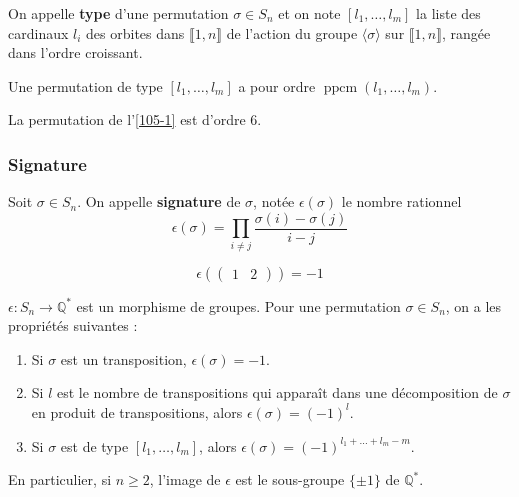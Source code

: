   \begin{definition}
    On appelle \textbf{type} d'une permutation $\sigma \in S_n$ et on note $[l_1, \dots, l_m]$ la liste des cardinaux $l_i$ des orbites dans $\llbracket 1, n \rrbracket$ de l'action du groupe $\langle \sigma \rangle$ sur $\llbracket 1, n \rrbracket$, rangée dans l'ordre croissant.
  \end{definition}

  \begin{proposition}
    Une permutation de type $[l_1, \dots, l_m]$ a pour ordre $\operatorname{ppcm}(l_1, \dots, l_m)$.
  \end{proposition}

  \begin{example}
    La permutation de l'\cref{105-1} est d'ordre $6$.
  \end{example}

  \subsubsection{Signature}

  \begin{definition}
    Soit $\sigma \in S_n$. On appelle \textbf{signature} de $\sigma$, notée $\epsilon(\sigma)$ le nombre rationnel
    \[ \epsilon(\sigma) = \prod_{i \neq j} \frac{\sigma(i) - \sigma(j)}{i-j} \]
  \end{definition}

  \begin{example}
    \[ \epsilon(\begin{pmatrix} 1 & 2 \end{pmatrix}) = -1 \]
  \end{example}

  \begin{proposition}
    $\epsilon : S_n \rightarrow \mathbb{Q}^*$ est un morphisme de groupes. Pour une permutation $\sigma \in S_n$, on a les propriétés suivantes :
    \begin{enumerate}[label=(\roman*)]
      \item Si $\sigma$ est un transposition, $\epsilon(\sigma) = -1$.
      \item Si $l$ est le nombre de transpositions qui apparaît dans une décomposition de $\sigma$ en produit de transpositions, alors $\epsilon(\sigma) = (-1)^l$.
      \item Si $\sigma$ est de type $[l_1, \dots, l_m]$, alors $\epsilon(\sigma) = (-1)^{l_1 + \dots + l_m - m}$.
    \end{enumerate}
    En particulier, si $n \geq 2$, l'image de $\epsilon$ est le sous-groupe $\{ \pm 1 \}$ de $\mathbb{Q}^*$.
  \end{proposition}

